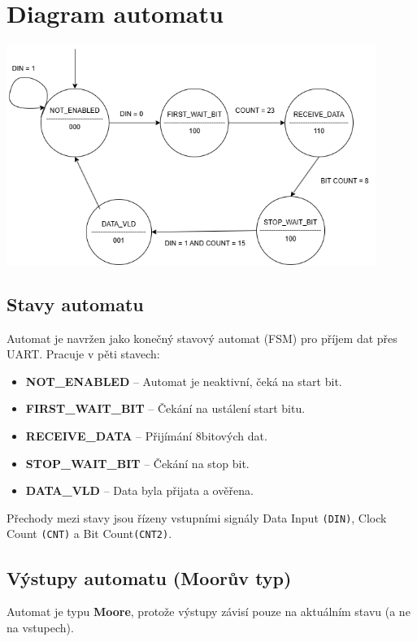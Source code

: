 \documentclass[10pt,a4paper]{article}
\begin{document}
\section{Diagram automatu}
\begin{center}
    \includegraphics[width=0.9\textwidth]{automat.png}
\end{center}

\subsection{Stavy automatu}
Automat je navržen jako konečný stavový automat (FSM) pro příjem dat přes UART. Pracuje v pěti stavech:

\begin{itemize}
    \item \textbf{NOT\_ENABLED} -- Automat je neaktivní, čeká na start bit.
    \item \textbf{FIRST\_WAIT\_BIT} -- Čekání na ustálení start bitu.
    \item \textbf{RECEIVE\_DATA} -- Přijímání 8bitových dat.
    \item \textbf{STOP\_WAIT\_BIT} -- Čekání na stop bit.
    \item \textbf{DATA\_VLD} -- Data byla přijata a ověřena.
\end{itemize}

\noindent
Přechody mezi stavy jsou řízeny vstupními signály Data Input \texttt{(DIN)}, Clock Count \texttt{(CNT)} a Bit Count\texttt{(CNT2)}.

\subsection{Výstupy automatu (Moorův typ)}
Automat je typu \textbf{Moore}, protože výstupy závisí pouze na aktuálním stavu (a ne na vstupech).
\end{document}
